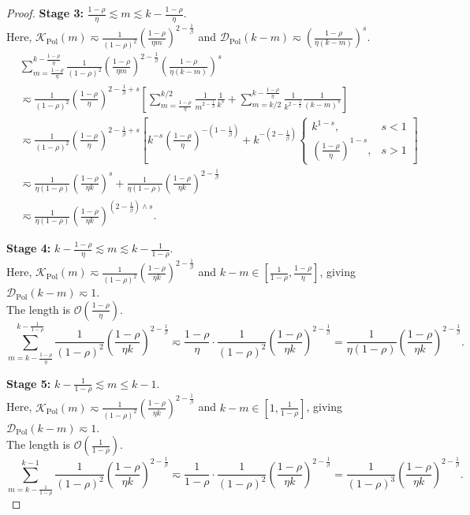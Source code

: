 \begin{proof}
\textbf{Stage 3:} $\frac{1-\rho}{\eta} \lesssim m \lesssim k - \frac{1-\rho}{\eta}$. \\
Here, $\mathcal K_{\mathrm{Pol}}(m) \eqsim \frac{1}{(1-\rho)^2} \left(\frac{1-\rho}{\eta m}\right)^{2-\frac1\beta}$ and $\mathcal D_{\mathrm{Pol}}(k-m) \eqsim \left(\frac{1-\rho}{\eta(k-m)}\right)^s$.
\begin{align*}
    &\sum_{m=\frac{1-\rho}{\eta}}^{k - \frac{1-\rho}{\eta}} \frac{1}{(1-\rho)^2} \left(\frac{1-\rho}{\eta m}\right)^{2-\frac1\beta} \left(\frac{1-\rho}{\eta(k-m)}\right)^s \\
    &\eqsim \frac{1}{(1-\rho)^2} \left(\frac{1-\rho}{\eta}\right)^{2-\frac1\beta+s} \left[ \sum_{m=\frac{1-\rho}{\eta}}^{k/2} \frac{1}{m^{2-\frac1\beta}} \frac{1}{k^s} + \sum_{m=k/2}^{k-\frac{1-\rho}{\eta}} \frac{1}{k^{2-\frac1\beta}} \frac{1}{(k-m)^s} \right] \\
    &\eqsim \frac{1}{(1-\rho)^2} \left(\frac{1-\rho}{\eta}\right)^{2-\frac1\beta+s} \left[ k^{-s} \left(\frac{1-\rho}{\eta}\right)^{-\left(1-\frac1\beta\right)} + k^{-\left(2-\frac1\beta\right)} \begin{cases} k^{1-s}, & s<1 \\ \left(\frac{1-\rho}{\eta}\right)^{1-s}, & s>1 \end{cases} \right] \\
    &\eqsim \frac{1}{\eta(1-\rho)} \left(\frac{1-\rho}{\eta k}\right)^s + \frac{1}{\eta(1-\rho)} \left(\frac{1-\rho}{\eta k}\right)^{2-\frac1\beta} \\
    &\eqsim \frac{1}{\eta(1-\rho)} \left(\frac{1-\rho}{\eta k}\right)^{\left(2-\frac1\beta\right)\wedge s}.
\end{align*}

\textbf{Stage 4:} $k - \frac{1-\rho}{\eta} \lesssim m \lesssim k - \frac{1}{1-\rho}$. \\
Here, $\mathcal K_{\mathrm{Pol}}(m) \eqsim \frac{1}{(1-\rho)^2} \left(\frac{1-\rho}{\eta k}\right)^{2-\frac1\beta}$ and $k-m \in [\frac{1}{1-\rho}, \frac{1-\rho}{\eta}]$, giving $\mathcal D_{\mathrm{Pol}}(k-m) \eqsim 1$.\\
The length is $\mathcal{O}(\frac{1-\rho}{\eta})$.
\[
    \sum_{m=k-\frac{1-\rho}{\eta}}^{k-\frac{1}{1-\rho}} \frac{1}{(1-\rho)^2} \left(\frac{1-\rho}{\eta k}\right)^{2-\frac1\beta} \eqsim \frac{1-\rho}{\eta} \cdot \frac{1}{(1-\rho)^2} \left(\frac{1-\rho}{\eta k}\right)^{2-\frac1\beta} = \frac{1}{\eta(1-\rho)} \left(\frac{1-\rho}{\eta k}\right)^{2-\frac1\beta}.
\]

\textbf{Stage 5:} $k - \frac{1}{1-\rho} \lesssim m \le k-1$. \\
Here, $\mathcal K_{\mathrm{Pol}}(m) \eqsim \frac{1}{(1-\rho)^2} \left(\frac{1-\rho}{\eta k}\right)^{2-\frac1\beta}$ and $k-m \in [1, \frac{1}{1-\rho}]$, giving $\mathcal D_{\mathrm{Pol}}(k-m) \eqsim 1$. \\
The length is $\mathcal{O}(\frac{1}{1-\rho})$.
\[
    \sum_{m=k-\frac{1}{1-\rho}}^{k-1} \frac{1}{(1-\rho)^2} \left(\frac{1-\rho}{\eta k}\right)^{2-\frac1\beta} \eqsim \frac{1}{1-\rho} \cdot \frac{1}{(1-\rho)^2} \left(\frac{1-\rho}{\eta k}\right)^{2-\frac1\beta} = \frac{1}{(1-\rho)^3} \left(\frac{1-\rho}{\eta k}\right)^{2-\frac1\beta}.
\]


\end{proof}
